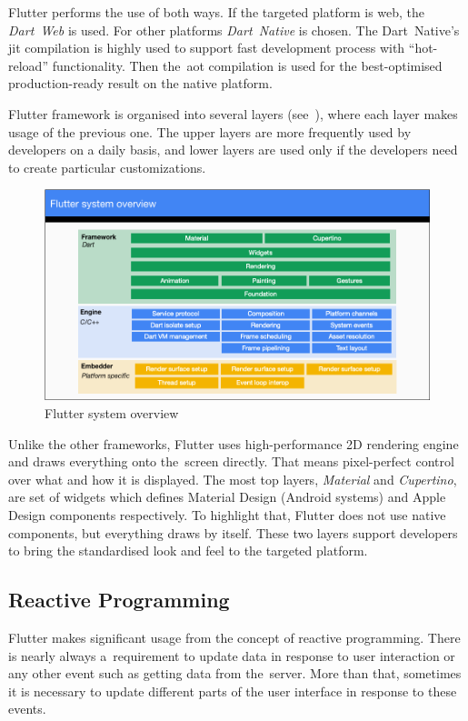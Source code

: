 Flutter performs the use of both ways. If the targeted platform is web, the \textit{Dart~Web} is used. For other platforms \textit{Dart~Native} is chosen. The Dart~Native's \gls{jit} compilation is highly used to support fast development process with ``hot-reload'' functionality. Then the~\gls{aot} compilation is used for the best-optimised production-ready result on the native platform.  

Flutter framework is organised into several layers (see~), where each layer makes usage of the previous one. The upper layers are more frequently used by developers on a daily basis, and lower layers are used only if the developers need to create particular customizations. 

\begin{figure}[htp]
    \centering
    \includegraphics[width=0.8\linewidth]{img/flutter/flutter-layer-cake.png}
    \caption{Flutter system overview~\cite{flutter-technical-overview}}
    \label{fig:flutter-layer-cake}
\end{figure}

Unlike the other frameworks, Flutter uses high-performance 2D rendering engine and draws everything onto the~screen directly. That means pixel-perfect control over what and how it is displayed. The most top layers, \textit{Material} and \textit{Cupertino}, are set of widgets which defines Material Design (Android systems) and Apple Design components respectively. To highlight that, Flutter does not use native components, but everything draws by itself. These two layers support developers to bring the standardised look and feel to the targeted platform.
\subsection{Reactive Programming}
Flutter makes significant usage from the concept of reactive programming. There is nearly always a~requirement to update data in response to user interaction or any other event such as getting data from the~server. More than that, sometimes it is necessary to update different parts of the user interface in response to these events. 

